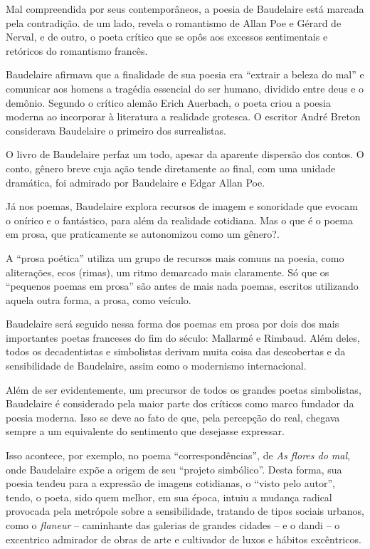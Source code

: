 \documentclass[12pt]{extarticle}
\begin{document}


Mal compreendida por seus contemporâneos, a poesia de Baudelaire está
marcada pela contradição. de um lado, revela o romantismo de Allan Poe e
Gérard de Nerval, e de outro, o poeta crítico que se opôs aos excessos
sentimentais e retóricos do romantismo francês.

Baudelaire afirmava que a finalidade de sua poesia era ``extrair a
beleza do mal'' e comunicar aos homens a tragédia essencial do ser
humano, dividido entre deus e o demônio.
Segundo o crítico alemão Erich Auerbach, o poeta criou a poesia moderna
ao incorporar à literatura a realidade grotesca. O escritor André Breton
considerava Baudelaire o primeiro dos surrealistas.

O livro de Baudelaire perfaz um todo, apesar da aparente dispersão dos
contos.
O conto, gênero breve cuja ação tende diretamente ao final, com uma
unidade dramática, foi admirado por Baudelaire e Edgar Allan Poe.

Já nos poemas, Baudelaire explora recursos de imagem e sonoridade que
evocam o onírico e o fantástico, para além da realidade cotidiana.
Mas o que é o poema em prosa, que praticamente se autonomizou como um
gênero?.

A ``prosa poética'' utiliza um grupo de recursos mais comuns na poesia,
como aliterações, ecos (rimas), um ritmo demarcado mais claramente.
Só que os ``pequenos poemas em prosa'' são antes de mais nada poemas,
escritos utilizando aquela outra forma, a prosa, como veículo.

Baudelaire será seguido nessa forma dos poemas em prosa por dois dos
mais importantes poetas franceses do fim do século: Mallarmé e
Rimbaud.
Além deles, todos os decadentistas e simbolistas derivam muita coisa
das descobertas e da sensibilidade de Baudelaire, assim como o
modernismo internacional.



Além de ser evidentemente, um precursor de todos os grandes poetas
simbolistas, Baudelaire é considerado pela maior parte dos críticos como
marco fundador da poesia moderna. Isso se deve ao fato de que, pela
percepção do real, chegava sempre a um equivalente do
sentimento que desejasse expressar.

Isso acontece, por exemplo, no poema ``correspondências'', de
\emph{As flores do mal}, onde Baudelaire expõe a origem de seu ``projeto simbólico''.
Desta forma, sua poesia tendeu para a expressão de imagens cotidianas, o
``visto pelo autor'', tendo, o poeta, sido quem melhor, em sua época,
intuiu a mudança radical provocada pela
metrópole sobre a
sensibilidade, tratando de tipos sociais urbanos, como o \textit{flaneur} --
caminhante das galerias de grandes cidades -- e o dandi -- o excentrico
admirador de obras de arte e cultivador de luxos e hábitos excêntricos.
\end{document}

